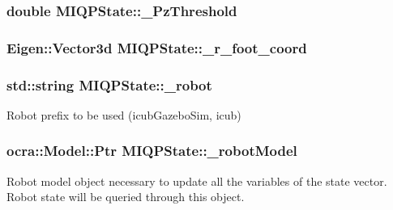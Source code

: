 {{\subsubsection[{\-\_\-\-Pz\-Threshold}]{\setlength{\rightskip}{0pt plus 5cm}double {\bf \-M\-I\-Q\-P\-State\-::\-\_\-\-Pz\-Threshold}}}\label{classMIQPState_af01491319642a332145ba8e8c23306b0}
\hypertarget{classMIQPState_a629de41d12e78c8a25b779758fd09bee}{
\subsubsection[{\-\_\-r\-\_\-foot\-\_\-coord}]{\setlength{\rightskip}{0pt plus 5cm}\-Eigen\-::\-Vector3d {\bf \-M\-I\-Q\-P\-State\-::\-\_\-r\-\_\-foot\-\_\-coord}}}\label{classMIQPState_a629de41d12e78c8a25b779758fd09bee}
\hypertarget{classMIQPState_ab472b9541beae0dacd48f8efb170490a}{
\subsubsection[{\-\_\-robot}]{\setlength{\rightskip}{0pt plus 5cm}std\-::string {\bf \-M\-I\-Q\-P\-State\-::\-\_\-robot}}}\label{classMIQPState_ab472b9541beae0dacd48f8efb170490a}
\-Robot prefix to be used (icub\-Gazebo\-Sim, icub) \hypertarget{classMIQPState_a0877788b247896c3434925e176c5045f}{
\subsubsection[{\-\_\-robot\-Model}]{\setlength{\rightskip}{0pt plus 5cm}ocra\-::\-Model\-::\-Ptr {\bf \-M\-I\-Q\-P\-State\-::\-\_\-robot\-Model}}}\label{classMIQPState_a0877788b247896c3434925e176c5045f}
\-Robot model object necessary to update all the variables of the state vector. \-Robot state will be queried through this object. \hypertarget{classMIQPState_a48c4888bcda11bf1cfcdbc59271de45a}{
}}
